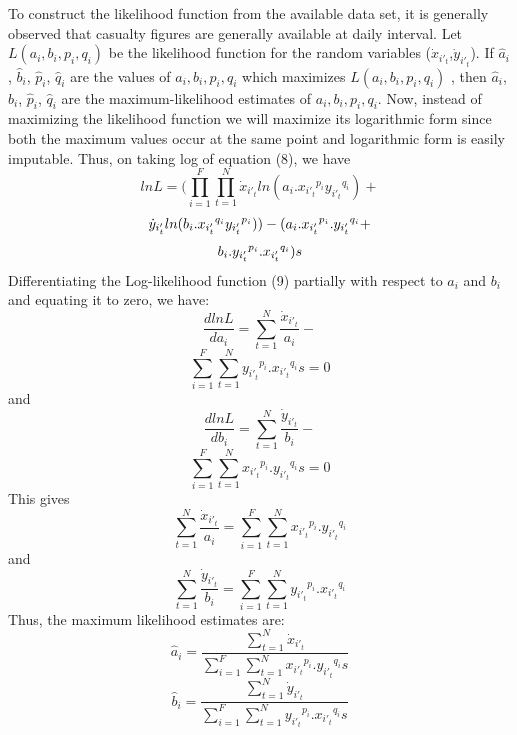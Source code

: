 \documentclass[]{article}
\begin{document}
To construct the likelihood function from the available data set, it is generally observed that casualty figures are generally available at daily interval. Let $L(a_i,b_i,p_i,q_i)$ be the likelihood function for the random variables ($\Dot{x}_{i'_t}$,$\Dot{y}_{i'_t}$). If $\hat{a}_i$, $\hat{b}_i$, $\hat{p}_i$, $\hat{q}_i$ are the values of  $a_i,b_i,p_i,q_i$ which maximizes $L(a_i,b_i,p_i,q_i)$ , then  $\hat{a}_i$, $\hat{b}_i$, $\hat{p}_i$, $\hat{q}_i$ are the maximum-likelihood estimates of  $a_i,b_i,p_i,q_i$. Now, instead of maximizing the likelihood function we will maximize its logarithmic form since both the maximum values occur at the same point and logarithmic form is easily imputable.
Thus, on taking log of equation (8), we have
\begin{equation}
     lnL=
     ({\prod_{i=1}^{F}}{\prod_{t=1}^{N}}{\Dot{x}_{i'_t}}ln(a_i.{x_{i'_t}}^{p_i}{y_{i'_t}}^{q_i})+
     \nonumber
\end{equation}
\begin{equation}
     \\  {\Dot{y}_{i'_t}}ln(b_i.{x_{i'_t}}^{q_i}{y_{i'_t}}^{p_i}))-{(a_i.{x_{i'_t}}^{p_i}.{y_{i'_t}}^{q_i}+}
     \nonumber
\end{equation}
\begin{equation}
     \\b_i.{y_{i'_t}}^{p_i}.{x_{i'_t}}^{q_i})s
\end{equation}
Differentiating the Log-likelihood function (9) partially with respect to $a_i$ and $b_i$ and equating it to zero, we have:
\begin{equation}
    \frac{dlnL}{da_i}=\sum_{t=1}^{N}{\frac{\Dot{x}_{i'_t}}{a_i}}-
    \nonumber
\end{equation}
\begin{equation}
    \sum_{i=1}^{F}\sum_{t=1}^{N}{y_{i'_t}}^{p_i}.{x_{i'_t}}^{q_i}s=0
\end{equation}
and
   \begin{equation}
    \frac{dlnL}{db_i}=\sum_{t=1}^{N}{\frac{\Dot{y}_{i'_t}}{b_i}}-
    \nonumber
\end{equation}
   \begin{equation}
    \sum_{i=1}^{F}\sum_{t=1}^{N}{x_{i'_t}}^{p_i}.{y_{i'_t}}^{q_i}s=0
\end{equation}
This gives
\begin{equation}
   \sum_{t=1}^{N}{\frac{\Dot{x}_{i'_t}}{a_i}}=\sum_{i=1}^{F}\sum_{t=1}^{N}{x_{i'_t}}^{p_i}.{y_{i'_t}}^{q_i}
\end{equation}
 and                             
 \begin{equation}
   \sum_{t=1}^{N}{\frac{\Dot{y}_{i'_t}}{b_i}}=\sum_{i=1}^{F}\sum_{t=1}^{N}{y_{i'_t}}^{p_i}.{x_{i'_t}}^{q_i}
\end{equation}
Thus, the maximum likelihood estimates are: 
\begin{equation}
\hat{a}_i=\frac{\sum_{t=1}^{N}{\Dot{x}_{i'_t}}}{\sum_{i=1}^{F}\sum_{t=1}^{N}{x_{i'_t}}^{p_i}.{y_{i'_t}}^{q_i}s}
\end{equation}
\begin{equation}
\hat{b}_i=\frac{\sum_{t=1}^{N}{\Dot{y}_{i'_t}}}{\sum_{i=1}^{F}\sum_{t=1}^{N}{y_{i'_t}}^{p_i}.{x_{i'_t}}^{q_i}s}
\end{equation}
\newpage
\end{document}
